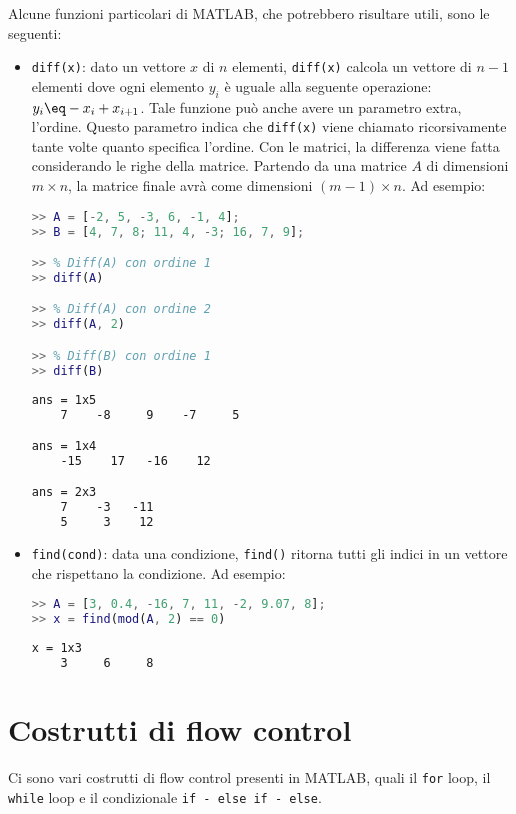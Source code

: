 Alcune funzioni particolari di MATLAB, che potrebbero risultare utili, sono le seguenti:
\begin{itemize}
    \item \texttt{diff(x)}: dato un vettore $x$ di $n$ elementi, \texttt{diff(x)} calcola un vettore di $n - 1$ elementi dove ogni elemento $y_i$ è uguale alla seguente operazione: $y_i \eq -x_i + x_{i + 1}$. Tale funzione può anche avere un parametro extra, l'ordine. Questo parametro indica che \texttt{diff(x)} viene chiamato ricorsivamente tante volte quanto specifica l'ordine. Con le matrici, la differenza viene fatta considerando le righe della matrice. Partendo da una matrice $A$ di dimensioni $m \times n$, la matrice finale avrà come dimensioni $(m - 1)\times n$. Ad esempio: 
    \begin{terminal}
        \begin{lstlisting}[language=MATLAB, style=notexterm]
>> A = [-2, 5, -3, 6, -1, 4];
>> B = [4, 7, 8; 11, 4, -3; 16, 7, 9];

>> % Diff(A) con ordine 1
>> diff(A)

>> % Diff(A) con ordine 2
>> diff(A, 2)

>> % Diff(B) con ordine 1
>> diff(B)\end{lstlisting}
        \tcblower
        \begin{lstlisting}[style=notexterm, language = tex]
ans = 1x5
    7    -8     9    -7     5

ans = 1x4
    -15    17   -16    12

ans = 2x3
    7    -3   -11
    5     3    12\end{lstlisting}
    \end{terminal}
    \item \texttt{find(cond)}: data una condizione, \texttt{find()} ritorna tutti gli indici in un vettore che rispettano la condizione. Ad esempio:
    \begin{terminal}
        \begin{lstlisting}[language=MATLAB, style=notexterm]
>> A = [3, 0.4, -16, 7, 11, -2, 9.07, 8];
>> x = find(mod(A, 2) == 0)\end{lstlisting}
        \tcblower
        \begin{lstlisting}[style=notexterm, language = tex]
x = 1x3
    3     6     8\end{lstlisting}
    \end{terminal}
\end{itemize}

\section{Costrutti di flow control}

Ci sono vari costrutti di flow control presenti in MATLAB, quali il \texttt{for} loop, il \texttt{while} loop e il condizionale \texttt{if - else if - else}.